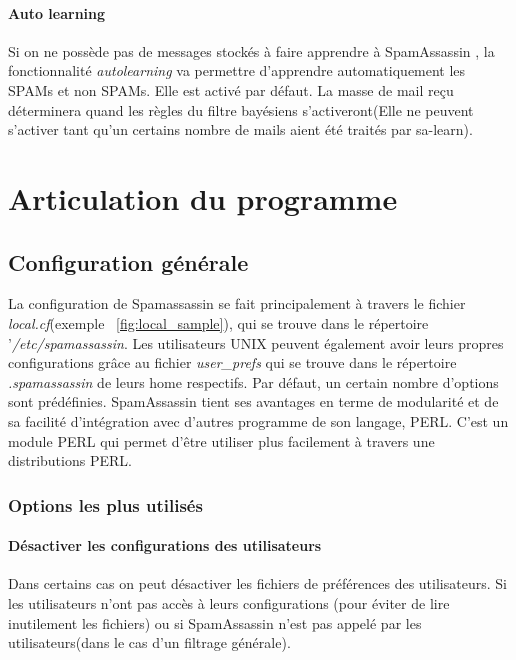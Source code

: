 \documentclass[a4paper,11pt]{article}
\begin{document}
\paragraph*{Auto learning}
Si on ne possède pas de messages stockés à faire apprendre à SpamAssassin , la fonctionnalité \emph{autolearning}
va permettre d'apprendre automatiquement les SPAMs et non SPAMs. Elle est activé par défaut. La masse de mail 
reçu déterminera quand les règles du filtre bayésiens s'activeront(Elle ne peuvent s'activer tant qu'un certains nombre de mails aient été traités par sa-learn).



\section{Articulation du programme}

\subsection{Configuration générale}

La configuration de Spamassassin se fait principalement à travers le fichier \emph{local.cf}(exemple ~\ref{fig:local_sample}), qui se trouve dans le 
répertoire '\emph{/etc/spamassassin}.
Les utilisateurs UNIX peuvent également avoir leurs propres configurations grâce au fichier \emph{user\_prefs}
qui se trouve dans le répertoire \emph{.spamassassin} de leurs home respectifs. 
Par défaut, un certain nombre d’options sont prédéfinies. 
\linebreak
SpamAssassin tient ses avantages en terme de modularité et de sa facilité d'intégration avec d'autres programme de son langage, PERL.
C'est un module PERL qui permet d'être utiliser plus facilement à travers une distributions PERL. 

\subsubsection{Options les plus utilisés}
\paragraph{Désactiver les configurations des utilisateurs}
Dans certains cas on peut désactiver les fichiers de préférences des utilisateurs. Si les utilisateurs n'ont pas accès à leurs configurations 
(pour éviter de lire inutilement les fichiers) ou si SpamAssassin n'est pas appelé par les utilisateurs(dans le cas d'un filtrage générale).
\end{document}
